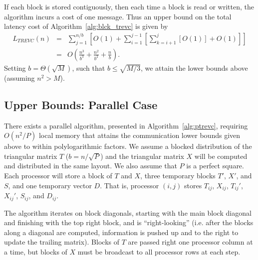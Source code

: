 \documentclass{article}
\def\lt{\left}
\def\rt{\right}
\theoremstyle{definition}
\begin{document}
If each block is stored contiguously, then each time a block is read or written, the algorithm incurs a cost of one message.  Thus an upper bound on the total latency cost of Algorithm~\ref{alg:blck_trevc} is given by
\begin{eqnarray*}
L_{TREVC}(n) &=& \sum_{j=1}^{n/b} \lt[ O(1) + \sum_{i=1}^{j-1} \lt[ \sum_{k=i+1}^j \lt[ O(1) \rt] + O(1) \rt] \rt] \\
 &=& O\lt( \frac{n^3}{b^3} + \frac{n^2}{b^2} + \frac nb \rt).
 \end{eqnarray*}
 Setting $b=\Theta(\sqrt M)$, such that $b\leq \sqrt{M/3}$, we attain the lower bounds above (assuming $n^2 > M$).

 \subsection{Upper Bounds: Parallel Case}


 There exists a parallel algorithm, presented in Algorithm~\ref{alg:ptrevc}, requiring $O(n^2 / P)$ local memory that attains the communication lower bounds given above to within polylogarithmic factors.  We assume a blocked distribution of the triangular matrix $T$ ($b=n/\sqrt P$) and the triangular matrix $X$ will be computed and distributed in the same layout.  We also assume that $P$ is a perfect square.  Each processor will store a block of $T$ and $X$, three temporary blocks $T'$, $X'$, and $S$, and one temporary vector $D$.  That is, processor $(i,j)$ stores $T_{ij}$, $X_{ij}$, $T_{ij}'$, $X_{ij}'$, $S_{ij}$, and $D_{ij}$.

 The algorithm iterates on block diagonals, starting with the main block diagonal and finishing with the top right block, and is ``right-looking'' (i.e. after the blocks along a diagonal are computed, information is pushed up and to the right to update the trailing matrix).  Blocks of $T$ are passed right one processor column at a time, but blocks of $X$ must be broadcast to all processor rows at each step.
\end{document}
